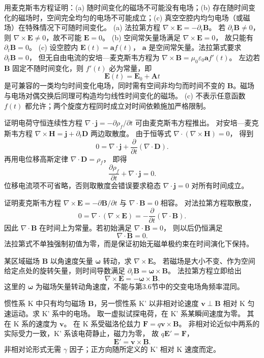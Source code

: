 用麦克斯韦方程证明：(a) 随时间变化的磁场不可能没有电场；(b) 存在随时间变化的磁场时，空间完全均匀的电场不可能成立；(c) 真空空腔内均匀电场（或磁场）在特殊情况下可随时间变化。
\exsolution
(a) 法拉第方程
$\nabla\times\bm E=-\partial_t\bm B$。
若 $\partial_t\bm B\ne0$，则
$\nabla\times\bm E\ne0$，故不可能 $\bm E=0$。
(b) 空间常矢量场满足 $\nabla\times\bm E=0$，
故只能有 $\partial_t\bm B=0$。
(c) 设空腔内 $\bm E(t)=\bm a f(t)$，
$\bm a$ 是空间常矢量。法拉第式要求
$\partial_t\bm B=0$，
但无自由电流的安培—麦克斯韦方程为
$\nabla\times\bm B=\mu_0\varepsilon_0\bm a f'(t)$。
左边若 $\bm B$ 固定不随时间变化，则 $f'(t)$ 必为常量，即
\[
\boxed{\bm E(t)=\bm E_0+\bm A t}
\]
是可兼容的一类均匀时间变化电场，同时需有空间非均匀而时间不变的 $\bm B$。磁场与电场对偶交换后同理可构造均匀线性时间变化的磁场。
\excheck (c) 不表示任意函数 $f(t)$ 都允许；两个旋度方程同时成立对时间依赖施加严格限制。

证明电荷守恒连续性方程
$\nabla\cdot\bm j=-\partial\rho_f/\partial t$
可由麦克斯韦方程推出。
\exsolution
对安培—麦克斯韦方程
$\nabla\times\bm H=\bm j+\partial_t\bm D$
两边取散度。
由于恒等式
$\nabla\cdot(\nabla\times\bm H)=0$，
得到
\[
0=\nabla\cdot\bm j+
\frac{\partial}{\partial t}(\nabla\cdot\bm D).
\]
再用电位移高斯定律
$\nabla\cdot\bm D=\rho_f$，
即得
\[
\boxed{\frac{\partial\rho_f}{\partial t}
+\nabla\cdot\bm j=0}.
\]
\excheck 位移电流项不可省略，否则取散度会错误要求稳态 $\nabla\cdot\bm j=0$ 对所有时间成立。

证明麦克斯韦方程
$\nabla\times\bm E=-\partial\bm B/\partial t$
与 $\nabla\cdot\bm B=0$ 相容。
\exsolution
对法拉第方程取散度，
\[
0=\nabla\cdot(\nabla\times\bm E)
=-\frac{\partial}{\partial t}(\nabla\cdot\bm B).
\]
因此
$\nabla\cdot\bm B$ 在时间上为常量。若初始满足
$\nabla\cdot\bm B=0$，
则以后仍恒满足
\[
\boxed{\nabla\cdot\bm B=0}.
\]
\excheck 法拉第式不单独强制初值为零，而是保证初始无磁单极约束在时间演化下保持。

某区域磁场 $\bm B$ 以角速度矢量 $\bm\omega$ 转动，求 $\nabla\times\bm E$。
\exsolution
若磁场是大小不变、作为空间给定点处的旋转矢量，则时间导数满足
$\partial_t\bm B=\bm\omega\times\bm B$。
法拉第方程立即给出
\[
\boxed{\nabla\times\bm E
=-\bm\omega\times\bm B}.
\]
\excheck 这里的 $\bm\omega$ 为磁场矢量转动角速度，不能与第3.6节中的交变电场角频率混同。

惯性系 K 中只有均匀磁场 $\bm B$，另一惯性系 K' 以非相对论速度 $\bm v\perp\bm B$ 相对 K 匀速运动。求 K' 系中的电场。
\exsolution
取一虚拟试探电荷，在 K' 系某瞬间速度为零。
其在 K 系的速度为 $\bm v$。
在 K 系受磁洛伦兹力
$\bm F=q\bm v\times\bm B$。
非相对论近似中两系的实际受力一致，K' 系该电荷静止，磁力为零，
故 $q\bm E'=\bm F$，
\[
\boxed{\bm E'=\bm v\times\bm B}.
\]
\excheck 非相对论形式无需 $\gamma$ 因子；正方向随所定义的 K' 相对 K 速度而定。

